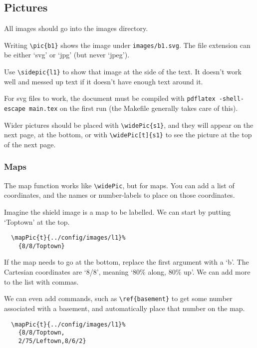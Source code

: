 \documentclass[a4paper,openany]{book}
\begin{document}
\begin{multicols}{2}
\subsection{Pictures}

All images should go into the images directory.

Writing \verb"\pic{b1}" shows the image under \verb"images/b1.svg".
The file extension can be either `svg' or `jpg' (but never `jpeg').

Use \verb"\sidepic{l1}" to show that image at the side of the text.
It doesn't work well and messed up text if it doesn't have enough text around it.


For svg files to work, the document must be compiled with \verb"pdflatex -shell-escape main.tex" on the first run (the Makefile generally takes care of this).

Wider pictures should be placed with \verb"\widePic{s1}", and they will appear on the next page, at the bottom, or with \verb"\widePic[t]{s1}" to see the picture at the top of the next page.


\subsubsection{Maps}

The map function works like \verb"\widePic", but for maps.
You can add a list of coordinates, and the names or number-labels to place on those coordinates.


Imagine the shield image is a map to be labelled.
We can start by putting `Toptown' at the top.

\begin{verbatim}
  \mapPic{t}{../config/images/l1}%
    {8/8/Toptown}
\end{verbatim}

If the map needs to go at the bottom, replace the first argument with a `b'.
The Cartesian coordinates are `8/8', meaning `80\% along, 80\% up'.
We can add more to the list with commas.

We can even add commands, such as \verb"\ref{basement}" to get some number associated with a basement, and automatically place that number on the map.

\begin{verbatim}
  \mapPic{t}{../config/images/l1}%
    {8/8/Toptown,
    2/75/Leftown,8/6/2}
\end{verbatim}


\end{multicols}
\end{document}
